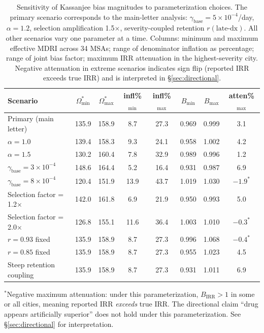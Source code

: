 \documentclass[11pt]{article}
\begin{document}
\begin{table}[H]
\centering
\small
\caption{Sensitivity of Kassanjee bias magnitudes to parameterization choices. The primary scenario corresponds to the main-letter analysis: $\gamma_{\mathrm{base}} = 5\times10^{-4}$/day, $\alpha = 1.2$, selection amplification 1.5$\times$, severity-coupled retention $r(\text{late-dx})$. All other scenarios vary one parameter at a time. Columns: minimum and maximum effective MDRI across 34 MSAs; range of denominator inflation as percentage; range of joint bias factor; maximum IRR attenuation in the highest-severity city. Negative attenuation in extreme scenarios indicates sign flip (reported IRR exceeds true IRR) and is interpreted in §\ref{sec:directional}.}
\label{tab:sensitivity}
\begin{tabular}{lccccccc}
\toprule
Scenario & $\Omega^*_{\min}$ & $\Omega^*_{\max}$ & infl\%$_{\min}$ & infl\%$_{\max}$ & $B_{\min}$ & $B_{\max}$ & atten\%$_{\max}$ \\
\midrule
Primary (main letter)          & 135.9 & 158.9 & 8.7  & 27.3 & 0.969 & 0.999 & 3.1 \\
\midrule
$\alpha = 1.0$                 & 139.4 & 158.3 & 9.3  & 24.1 & 0.958 & 1.002 & 4.2 \\
$\alpha = 1.5$                 & 130.2 & 160.4 & 7.8  & 32.9 & 0.989 & 0.996 & 1.2 \\
$\gamma_{\mathrm{base}} = 3\times10^{-4}$ & 148.6 & 164.4 & 5.2  & 16.4 & 0.931 & 0.987 & 6.9 \\
$\gamma_{\mathrm{base}} = 8\times10^{-4}$ & 120.4 & 151.9 & 13.9 & 43.7 & 1.019 & 1.030 & $-1.9^*$ \\
Selection factor = 1.2$\times$ & 142.0 & 161.8 & 6.9  & 21.9 & 0.950 & 0.993 & 5.0 \\
Selection factor = 2.0$\times$ & 126.8 & 155.1 & 11.6 & 36.4 & 1.003 & 1.010 & $-0.3^*$ \\
$r = 0.93$ fixed               & 135.9 & 158.9 & 8.7  & 27.3 & 0.996 & 1.068 & $-0.4^*$ \\
$r = 0.85$ fixed               & 135.9 & 158.9 & 8.7  & 27.3 & 0.955 & 1.023 & 4.5 \\
Steep retention coupling       & 135.9 & 158.9 & 8.7  & 27.3 & 0.931 & 1.011 & 6.9 \\
\bottomrule
\end{tabular}
\vspace{0.3em}
\footnotesize
\begin{flushleft}
$^*$Negative maximum attenuation: under this parameterization, $B_{\mathrm{IRR}} > 1$ in some or all cities, meaning reported IRR \emph{exceeds} true IRR. The directional claim ``drug appears artificially superior'' does not hold under this parameterization. See §\ref{sec:directional} for interpretation.
\end{flushleft}
\end{table}
\end{document}
